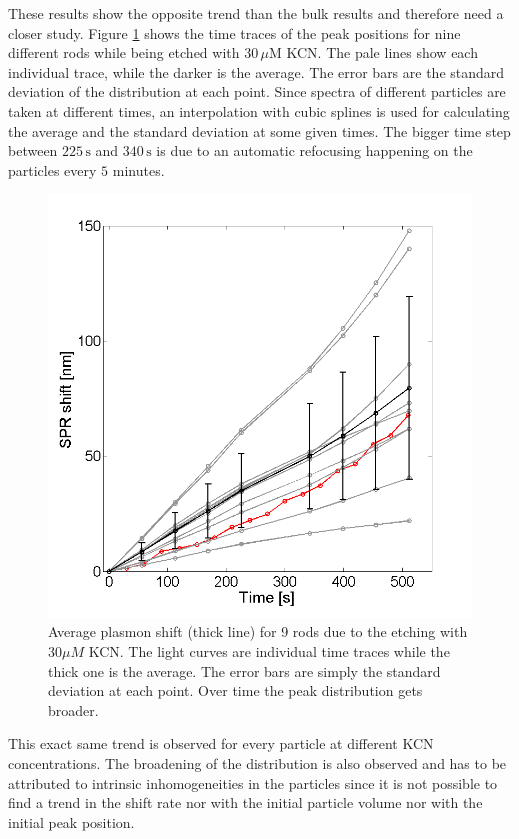 \documentclass[twocolumn]{article}
\begin{document}
These results show the opposite trend than the bulk results and therefore need a
closer study. Figure \ref{fig:plasmon_average} shows the time traces of the peak
positions for nine different rods while being etched with $30\,\mu\textrm{M}$
KCN. The pale lines show each individual trace, while the darker is the average.
The error bars are the standard deviation of the distribution at each point.
Since spectra of different particles are taken at different times, an
interpolation with cubic splines is used for calculating the average and the
standard deviation at some given times. The bigger time step between
$225\,\textrm{s}$ and $340\,\textrm{s}$ is due to an automatic refocusing
happening on the particles every $5$ minutes.

\begin{figure}[tp]
 \centering
 \includegraphics[width=0.95\linewidth]{plasmon_average.png}
 \caption{Average plasmon shift (thick line) for 9 rods due to the etching with
 $30\mu M$ KCN. The light curves are individual time traces while the thick one
 is the average. The error bars are simply the standard deviation at each point. Over
 time the peak distribution gets broader.}
 \label{fig:plasmon_average}
\end{figure}

This exact same trend is observed for every particle at different KCN
concentrations. The broadening of the distribution is also observed and has to
be attributed to intrinsic inhomogeneities in the particles since it is not
possible to find a trend in the shift rate nor with the initial particle 
volume nor with the initial peak position. 
\end{document}
